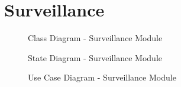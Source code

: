 \documentclass[english]{article}
\begin{document}
    \section{Surveillance}
        \begin{figure}[H]
            \centering	            \centerline{}
            \caption{Class Diagram - Surveillance Module}
        \end{figure}

        \begin{figure}[H]
            \centering	            \centerline{}
            \caption{State Diagram - Surveillance Module}
        \end{figure}

        \begin{figure}[H]
            \centering	            \centerline{}
            \caption{Use Case Diagram - Surveillance Module}
        \end{figure}
\end{document}
